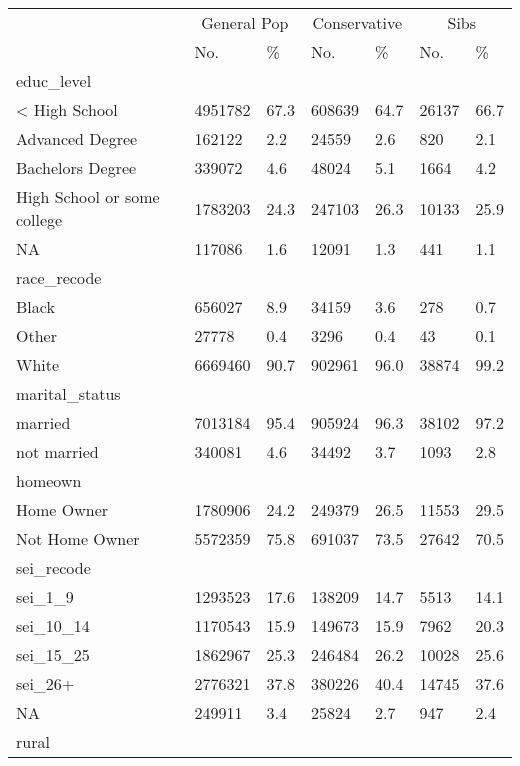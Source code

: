 \captionsetup[table]{labelformat=empty,skip=1pt}
\begin{longtable}{lllllll}
\toprule
& \multicolumn{2}{c}{General Pop} & \multicolumn{2}{c}{Conservative} & \multicolumn{2}{c}{Sibs} \\ 
 \cmidrule(lr){2-3}\cmidrule(lr){4-5}\cmidrule(lr){6-7}
 & No. & \% & No. & \% & No. & \% \\ 
\midrule
\multicolumn{1}{l}{educ\_level} \\ 
\midrule
< High School & 4951782 & 67.3 & 608639 & 64.7 & 26137 & 66.7 \\ 
Advanced Degree & 162122 & 2.2 & 24559 & 2.6 & 820 & 2.1 \\ 
Bachelors Degree & 339072 & 4.6 & 48024 & 5.1 & 1664 & 4.2 \\ 
High School or some college & 1783203 & 24.3 & 247103 & 26.3 & 10133 & 25.9 \\ 
NA & 117086 & 1.6 & 12091 & 1.3 & 441 & 1.1 \\ 
\midrule
\multicolumn{1}{l}{race\_recode} \\ 
\midrule
Black & 656027 & 8.9 & 34159 & 3.6 & 278 & 0.7 \\ 
Other & 27778 & 0.4 & 3296 & 0.4 & 43 & 0.1 \\ 
White & 6669460 & 90.7 & 902961 & 96.0 & 38874 & 99.2 \\ 
\midrule
\multicolumn{1}{l}{marital\_status} \\ 
\midrule
married & 7013184 & 95.4 & 905924 & 96.3 & 38102 & 97.2 \\ 
not married & 340081 & 4.6 & 34492 & 3.7 & 1093 & 2.8 \\ 
\midrule
\multicolumn{1}{l}{homeown} \\ 
\midrule
Home Owner & 1780906 & 24.2 & 249379 & 26.5 & 11553 & 29.5 \\ 
Not Home Owner & 5572359 & 75.8 & 691037 & 73.5 & 27642 & 70.5 \\ 
\midrule
\multicolumn{1}{l}{sei\_recode} \\ 
\midrule
sei\_1\_9 & 1293523 & 17.6 & 138209 & 14.7 & 5513 & 14.1 \\ 
sei\_10\_14 & 1170543 & 15.9 & 149673 & 15.9 & 7962 & 20.3 \\ 
sei\_15\_25 & 1862967 & 25.3 & 246484 & 26.2 & 10028 & 25.6 \\ 
sei\_26+ & 2776321 & 37.8 & 380226 & 40.4 & 14745 & 37.6 \\ 
NA & 249911 & 3.4 & 25824 & 2.7 & 947 & 2.4 \\ 
\midrule
\multicolumn{1}{l}{rural} \\ 

\end{longtable}
